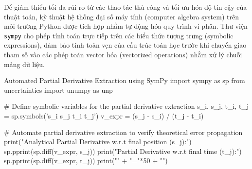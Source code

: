 Để giảm thiểu tối đa rủi ro từ các thao tác thủ công và tối ưu hóa độ tin cậy của thuật toán, kỹ thuật hệ thống đại số máy tính (computer algebra system) trên môi trường Python được tích hợp nhằm tự động hóa quy trình vi phân. Thư viện \texttt{sympy} cho phép tính toán trực tiếp trên các biểu thức tượng trưng (symbolic expressions), đảm bảo tính toàn vẹn của cấu trúc toán học trước khi chuyển giao tham số vào các phép toán vector hóa (vectorized operations) nhằm xử lý chuỗi mảng dữ liệu.

\begin{pycode}{Automated Partial Derivative Extraction using SymPy}
import sympy as sp
from uncertainties import unumpy as unp

# Define symbolic variables for the partial derivative extraction
s_i, s_j, t_i, t_j = sp.symbols('s_i s_j t_i t_j')
v_expr = (s_j - s_i) / (t_j - t_i)

# Automate partial derivative extraction to verify theoretical error propagation
print("Analytical Partial Derivative w.r.t final position (s_j):")
sp.pprint(sp.diff(v_expr, s_j))
print("\nAnalytical Partial Derivative w.r.t final time (t_j):")
sp.pprint(sp.diff(v_expr, t_j))
print("\n" + "="*50 + "\n")
\end{pycode}